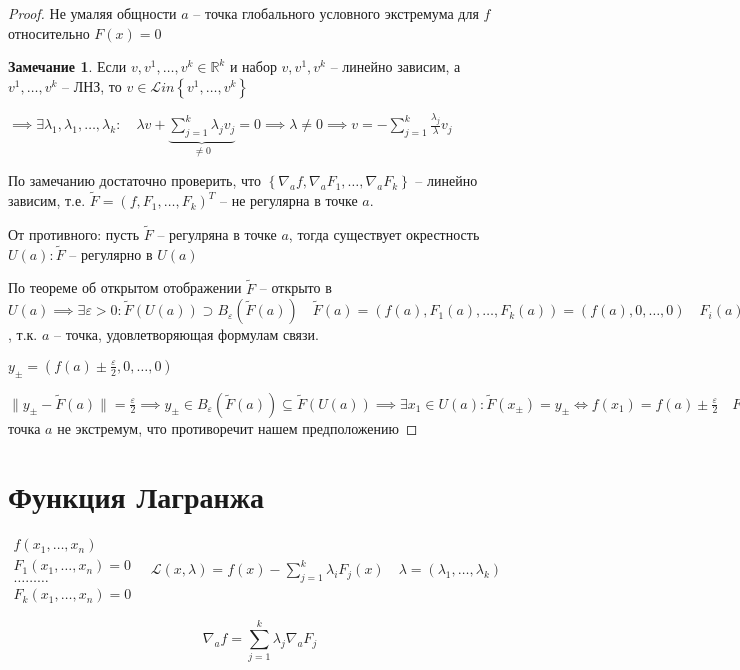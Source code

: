\documentclass{book}
\newcommand\R{\ensuremath{\mathbb{R}}}
\newcommand{\tl}[1]{\widetilde{#1}}
\theoremstyle{definition}
\newtheorem*{note}{Замечание}
\begin{document}
\begin{proof}
    Не умаляя общности $a$ -- точка глобального условного экстремума для  $f$ относительно  $F(x) = 0$

     \begin{note}
         Если $v, v^{1}, \ldots, v^{k}\in \R^k$ и набор $v, v^{1}, v^{k}$ -- линейно зависим, а $v^{1}, \ldots, v^{k}$ -- ЛНЗ, то $v\in \mathcal Lin\left\{ v^1, \ldots, v^k \right\} $ 

         $\implies \exists \lambda_1, \lambda_1, \ldots, \lambda_k:\quad \lambda v + \underbrace{\sum_{j=1}^{k} \lambda_jv_j}_{\neq 0} = 0\implies \lambda\neq 0 \implies v = -\sum_{j=1}^{k} \frac{\lambda_j}{\lambda}v_j$
    \end{note}

    По замечанию достаточно проверить, что $\left\{\nabla _af, \nabla _a F_1, \ldots, \nabla _a F_k\right\}$ -- линейно зависим, т.е. $\tl F = \left( f, F_1, \ldots, F_k \right) ^T$ -- не регулярна в точке $a$.

    От противного: пусть  $\tl F$ -- регулряна в точке $a$, тогда существует окрестность  $U(a): \tl F$ -- регулярно в $U(a)$ 

    По теореме об открытом отображении $\tl F$ -- открыто в  $U(a) \implies \exists \varepsilon >0: \tl F(U(a)) \supset B_{\varepsilon}\left( \tl F(a) \right)\quad \tl F(a) = \left( f(a), F_1(a), \ldots, F_k(a) \right)  = (f(a), 0, \ldots, 0)\quad F_i(a) = 0 $, т.к. $a$ -- точка, удовлетворяющая формулам связи.

    $y_{\pm } = \left( f(a) \pm \frac{\varepsilon}{2}, 0, \ldots, 0 \right) $

    $\|y_{\pm} - \tl F(a)\| = \frac{\varepsilon}{2} \implies y_{\pm}\in B_{\varepsilon}\left( \tl F(a) \right) \subseteq \tl F(U(a)) \implies \exists x_1\in U(a): \tl F(x_{\pm}) = y_{\pm} \iff  f(x_1) = f(a) \pm \frac{\varepsilon}{2}\quad F_1(x_{\pm}) = \ldots = F_k\left( x_{\pm} \right) \implies x_{\pm}\in E?!!  \implies $ точка $a$ не экстремум, что противоречит нашем предположению
\end{proof}

\section{Функция Лагранжа}

\begin{definition}
    $
    \begin{matrix}
        f\left( x_1, \ldots, x_{n}  \right) \\
        F_1\left( x_1, \ldots, x_{n}  \right) =0\\
        \ldots\ldots\ldots\\
        F_k\left( x_1, \ldots, x_{n}  \right) =0
    \end{matrix}\quad \mathcal L\left( x, \lambda \right)  = f(x) - \sum_{j=1}^{k} \lambda_iF_j(x)\quad \lambda = \left( \lambda_1, \ldots, \lambda_k \right) $

    \[\nabla _af = \sum_{j=1}^{k} \lambda_j \nabla _aF_j\]
\end{definition}
\end{document}

